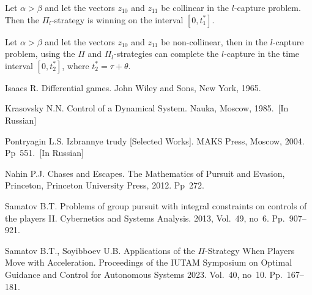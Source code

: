 \documentclass[12pt]{llncs}
\begin{document}
\begin{theorem}
Let $\alpha>\beta$ and let the vectors $z_{10}$ and $z_{11}$ be collinear in the $l$-capture problem. Then the $\Pi_l$-strategy is winning on the interval $[0, t^{*}_{1}]$.
\end{theorem}
\begin{theorem}
Let $\alpha>\beta$ and let the vectors $z_{10}$ and $z_{11}$ be non-collinear, then in the $l$-capture problem, using the $\Pi$ and $\Pi_l$-strategies can complete the $l$-capture in the time interval $[0,t^{*}_{2}]$, where $t^{*}_{2}=\tau+\theta$.
\end{theorem}
\begin{thebibliography}{9} %
 Isaacs R. Differential games. John Wiley and Sons, New York, 1965.

 Krasovsky N.N. Control of a Dynamical System. Nauka, Moscow, 1985.~[In Russian]

  Pontryagin L.S. Izbrannye trudy [Selected Works]. MAKS Press, Moscow, 2004. Pp~551.~[In Russian]

 Nahin P.J. Chases and Escapes. The Mathematics of Pursuit and Evasion, Princeton, Princeton University Press, 2012. Pp~272.

 Samatov B.T. Problems of group pursuit with integral constraints on controls of the players II. Cybernetics and
Systems Analysis. 2013, Vol.~49, no~6. Pp.~907--921.

 Samatov B.T., Soyibboev U.B. Applications of the $\Pi$-Strategy When Players Move with Acceleration. Proceedings of the IUTAM Symposium on Optimal Guidance and Control for Autonomous Systems 2023. Vol.~40, no~10. Pp.~167--181.

\end{thebibliography}
\end{document}
